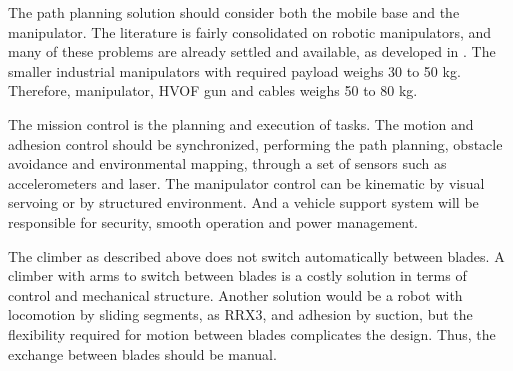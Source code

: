 The path planning solution should consider both the mobile base and the
manipulator. The literature is fairly consolidated on robotic manipulators, and
many of these problems are already settled and available, as developed in
\cite{manzdevelopment}. The smaller industrial manipulators with required
payload weighs 30 to 50 kg. Therefore, manipulator, HVOF gun and cables weighs
50 to 80 kg.



The mission control is the planning and execution of tasks. The motion and
adhesion control should be synchronized, performing the path planning,
obstacle avoidance and environmental mapping, through a set of sensors such as
accelerometers and laser. The manipulator control can be kinematic by visual
servoing or by structured environment. And a vehicle support system will be
responsible for security, smooth operation and power management.



The climber as described above does not switch automatically between blades.
A climber with arms to switch between blades is a costly solution in terms
of control and mechanical structure. Another solution would be a robot with
locomotion by sliding segments, as RRX3, and adhesion by suction, but the
flexibility required for motion between blades complicates the design. Thus, the exchange between blades should be
manual.

